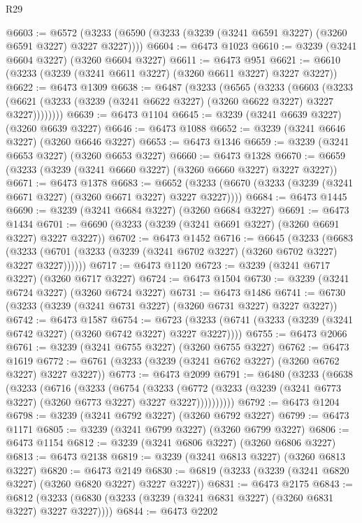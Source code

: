 \begin{lexlean}{R29}
\begin{coremodule}
@6603 := @6572 (@3233 (@6590 (@3233 (@3239 (@3241 @6591 @3227) (@3260 @6591 @3227) @3227 @3227))))
@6604 := @6473 @1023
@6610 := @3239 (@3241 @6604 @3227) (@3260 @6604 @3227)
@6611 := @6473 @951
@6621 := @6610 (@3233 (@3239 (@3241 @6611 @3227) (@3260 @6611 @3227) @3227 @3227))
@6622 := @6473 @1309
@6638 := @6487
    (@3233
      (@6565
        (@3233
          (@6603
            (@3233 (@6621 (@3233 (@3239 (@3241 @6622 @3227) (@3260 @6622 @3227) @3227 @3227))))))))
@6639 := @6473 @1104
@6645 := @3239 (@3241 @6639 @3227) (@3260 @6639 @3227)
@6646 := @6473 @1088
@6652 := @3239 (@3241 @6646 @3227) (@3260 @6646 @3227)
@6653 := @6473 @1346
@6659 := @3239 (@3241 @6653 @3227) (@3260 @6653 @3227)
@6660 := @6473 @1328
@6670 := @6659 (@3233 (@3239 (@3241 @6660 @3227) (@3260 @6660 @3227) @3227 @3227))
@6671 := @6473 @1378
@6683 := @6652 (@3233 (@6670 (@3233 (@3239 (@3241 @6671 @3227) (@3260 @6671 @3227) @3227 @3227))))
@6684 := @6473 @1445
@6690 := @3239 (@3241 @6684 @3227) (@3260 @6684 @3227)
@6691 := @6473 @1434
@6701 := @6690 (@3233 (@3239 (@3241 @6691 @3227) (@3260 @6691 @3227) @3227 @3227))
@6702 := @6473 @1452
@6716 := @6645
    (@3233
      (@6683 (@3233 (@6701 (@3233 (@3239 (@3241 @6702 @3227) (@3260 @6702 @3227) @3227 @3227))))))
@6717 := @6473 @1120
@6723 := @3239 (@3241 @6717 @3227) (@3260 @6717 @3227)
@6724 := @6473 @1504
@6730 := @3239 (@3241 @6724 @3227) (@3260 @6724 @3227)
@6731 := @6473 @1486
@6741 := @6730 (@3233 (@3239 (@3241 @6731 @3227) (@3260 @6731 @3227) @3227 @3227))
@6742 := @6473 @1587
@6754 := @6723 (@3233 (@6741 (@3233 (@3239 (@3241 @6742 @3227) (@3260 @6742 @3227) @3227 @3227))))
@6755 := @6473 @2066
@6761 := @3239 (@3241 @6755 @3227) (@3260 @6755 @3227)
@6762 := @6473 @1619
@6772 := @6761 (@3233 (@3239 (@3241 @6762 @3227) (@3260 @6762 @3227) @3227 @3227))
@6773 := @6473 @2099
@6791 := @6480
    (@3233
      (@6638
        (@3233
          (@6716
            (@3233
              (@6754
                (@3233
                  (@6772 (@3233 (@3239 (@3241 @6773 @3227) (@3260 @6773 @3227) @3227 @3227))))))))))
@6792 := @6473 @1204
@6798 := @3239 (@3241 @6792 @3227) (@3260 @6792 @3227)
@6799 := @6473 @1171
@6805 := @3239 (@3241 @6799 @3227) (@3260 @6799 @3227)
@6806 := @6473 @1154
@6812 := @3239 (@3241 @6806 @3227) (@3260 @6806 @3227)
@6813 := @6473 @2138
@6819 := @3239 (@3241 @6813 @3227) (@3260 @6813 @3227)
@6820 := @6473 @2149
@6830 := @6819 (@3233 (@3239 (@3241 @6820 @3227) (@3260 @6820 @3227) @3227 @3227))
@6831 := @6473 @2175
@6843 := @6812 (@3233 (@6830 (@3233 (@3239 (@3241 @6831 @3227) (@3260 @6831 @3227) @3227 @3227))))
@6844 := @6473 @2202

\end{coremodule}
\end{lexlean}
